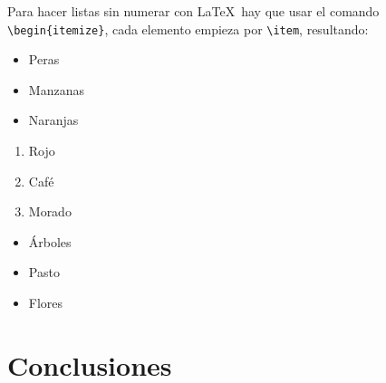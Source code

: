 		Para hacer listas sin numerar con \LaTeX\ hay que usar el comando \texttt{\textbackslash begin\{itemize\}}, cada elemento empieza por \texttt{\textbackslash item}, resultando:

		\begin{multicols}{3}
			\begin{itemize}[label={--}]
				\item Peras
				\item Manzanas
				\item Naranjas
			\end{itemize}

			\begin{enumerate}[label={*}]
				\item Rojo
				\item Café
				\item Morado
			\end{enumerate}

			\begin{itemize}
				\item Árboles
				\item Pasto
				\item Flores
			\end{itemize}
		\end{multicols}


\chapter{Conclusiones}

\lipsum[1]
\newp \lipsum[2]


 


